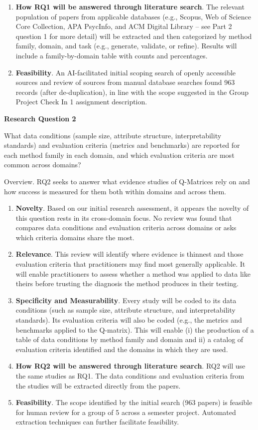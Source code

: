 \documentclass[sigconf]{acmart}
\begin{document}
\begin{enumerate}
    \item \textbf{How RQ1 will be answered through literature search}. The relevant population of papers from applicable databases (e.g., Scopus, Web of Science Core Collection, APA PsycInfo, and ACM Digital Library – see Part 2 question 1 for more detail) will be extracted and then categorized by method family, domain, and task (e.g., generate, validate, or refine). Results will include a family-by-domain table with counts and percentages. 
    \item \textbf{Feasibility}. An AI-facilitated initial scoping search of openly accessible sources and review of sources from manual database searches found 963 records (after de-duplication), in line with the scope suggested in the Group Project Check In 1 assignment description.
\end{enumerate}

\textbf{Research Question 2}

What data conditions (sample size, attribute structure, interpretability standards) and evaluation criteria (metrics and benchmarks) are reported for each method family in each domain, and which evaluation criteria are most common across domains?

Overview. RQ2 seeks to answer what evidence studies of Q-Matrices rely on and how success is measured for them both within domains and across them. 

\begin{enumerate}
    \item \textbf{Novelty}. Based on our initial research assessment, it appears the novelty of this question rests in its cross-domain focus. No review was found that compares data conditions and evaluation criteria across domains or asks which criteria domains share the most.
    \item \textbf{Relevance}. This review will identify where evidence is thinnest and those evaluation criteria that practitioners may find most generally applicable. It will enable practitioners to assess whether a method was applied to data like theirs before trusting the diagnosis the method produces in their testing.
    \item \textbf{Specificity and Measurability}. Every study will be coded to its data conditions (such as sample size, attribute structure, and interpretability standards). Its evaluation criteria will also be coded (e.g., the metrics and benchmarks applied to the Q-matrix). This will enable (i) the production of a table of data conditions by method family and domain and ii) a catalog of evaluation criteria identified and the domains in which they are used.
    \item \textbf{How RQ2 will be answered through literature search}. RQ2 will use the same studies as RQ1. The data conditions and evaluation criteria from the studies will be extracted directly from the papers.
    \item \textbf{Feasibility}. The scope identified by the initial search (963 papers) is feasible for human review for a group of 5 across a semester project. Automated extraction techniques can further facilitate feasibility.
\end{enumerate}
\end{document}
